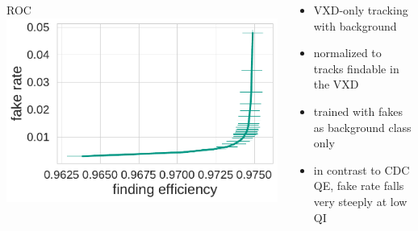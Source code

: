 \documentclass[18pt, aspectratio=169]{beamer}
\begin{document}
\begin{frame}
\begin{columns}
\begin{column}{.33\textwidth}
    \end{column}
  \end{columns}
  \begin{columns}
    \begin{column}{.4\textwidth}
      \centering
      ROC
      \includegraphics[width=\textwidth]{figures/vxd-qi/roc_curve.pdf}
    \end{column}
    \begin{column}{.6\textwidth}
      \begin{itemize}
      \item VXD-only tracking with background
      \item normalized to tracks findable in the VXD
      \item trained with fakes as background class only
      \item in contrast to CDC QE, fake rate falls very steeply at low QI
      \end{itemize}
    \end{column}
  \end{columns}
\end{frame}
\end{document}
